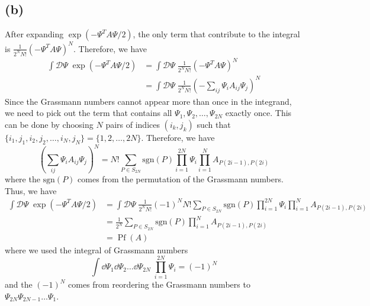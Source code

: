 \documentclass{article}
\begin{document}
\subsection*{(b)}
After expanding $\exp(-\Psi^T A\Psi/2)$, the only term that contribute to the integral is $\frac{1}{2^N N!}(-\Psi^T A \Psi)^N$.
Therefore, we have 
\begin{equation}
    \begin{split}
        \int\mathcal{D}\Psi \; \exp(-\Psi^T A \Psi/2)&=\int\mathcal{D}\Psi \; \frac{1}{2^N N!}(-\Psi^T A \Psi)^N\\
                                                   &=\int\mathcal{D}\Psi \; \frac{1}{2^N N!}\left(-\sum_{ij}\Psi_i A_{ij} \Psi_j\right)^N
    \end{split}
\end{equation}
Since the Grassmann numbers cannot appear more than once in the integrand, we need to pick out the term that contains all $\Psi_1, \Psi_2, \dots, \Psi_{2N}$ exactly once. This can be done by choosing $N$ pairs of indices $(i_k,j_k)$ such that $\{i_1,j_1,i_2,j_2,\dots,i_N,j_N\}=\{1,2,\dots,2N\}$. 
Therefore, we have
\begin{equation}
    \left(\sum_{ij}\Psi_i A_{ij} \Psi_j\right)^N =N! \sum_{P\in S_{2N}} \text{sgn}(P) \prod_{i=1}^{2N} \Psi_i \prod_{i=1}^N A_{P(2i-1),P(2i)}
\end{equation}
where the $\text{sgn}(P)$ comes from the permutation of the Grassmann numbers.
Thus, we have
\begin{equation}
    \begin{split}
        \int\mathcal{D}\Psi \; \exp(-\Psi^T A \Psi/2)&=\int\mathcal{D}\Psi \; \frac{1}{2^N N!}(-1)^N N! \sum_{P\in S_{2N}} \text{sgn}(P) \prod_{i=1}^{2N} \Psi_i \prod_{i=1}^N A_{P(2i-1),P(2i)}\\
                                                   &=\frac{1}{2^N}\sum_{P\in S_{2N}} \text{sgn}(P) \prod_{i=1}^N A_{P(2i-1),P(2i)}\\
                                                   &=\operatorname{Pf}(A)
    \end{split}
\end{equation}
where we used the integral of Grassmann numbers 
\begin{equation}
    \int\dd{\Psi_1}\dd{\Psi_2}\dots\dd{\Psi_{2N}} \; \prod_{i=1}^{2N} \Psi_i = (-1)^N
\end{equation}
and the $(-1)^N$ comes from reordering the Grassmann numbers to $\Psi_{2N}\Psi_{2N-1}\dots\Psi_1$.




%
%
\end{document}
